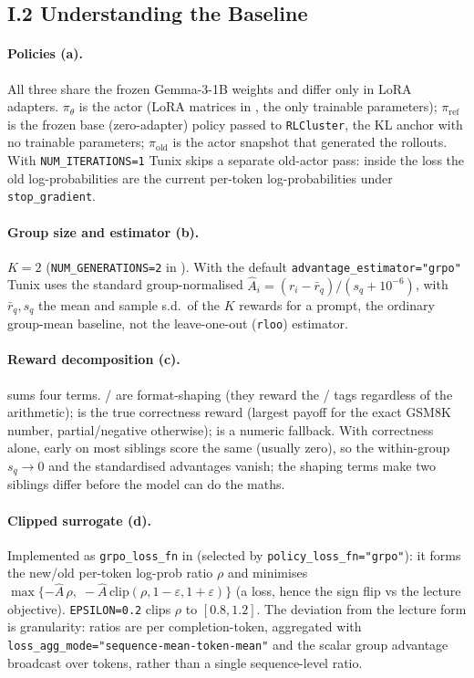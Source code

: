 \subsection{I.2 Understanding the Baseline}

\paragraph{Policies (a).}
All three share the frozen Gemma-3-1B weights and differ only in LoRA adapters. $\pi_\theta$ is the
actor (LoRA matrices in , the only trainable parameters);
$\pi_{\mathrm{ref}}$ is the frozen base (zero-adapter) policy passed to \texttt{RLCluster}, the KL
anchor with no trainable parameters; $\pi_{\mathrm{old}}$ is the actor snapshot that generated the
rollouts. With \texttt{NUM\_ITERATIONS=1} Tunix skips a separate old-actor pass: inside the loss
the old log-probabilities are the current per-token log-probabilities under \texttt{stop\_gradient}.

\paragraph{Group size and estimator (b).}
$K=2$ (\texttt{NUM\_GENERATIONS=2} in ). With the default
\texttt{advantage\_estimator="grpo"} Tunix uses the standard group-normalised
$\hat A_i = (r_i-\bar r_q)/(s_q+10^{-6})$, with $\bar r_q,s_q$ the mean and sample s.d.\ of the $K$
rewards for a prompt, the ordinary group-mean baseline, not the leave-one-out (\texttt{rloo})
estimator.

\paragraph{Reward decomposition (c).}
 sums four terms.
/ are format-shaping (they reward the
/ tags regardless of the arithmetic);  is the
true correctness reward (largest payoff for the exact GSM8K number, partial/negative otherwise);
 is a numeric fallback. With correctness alone, early on most siblings score the
same (usually zero), so the within-group $s_q\to0$ and the standardised advantages vanish; the
shaping terms make two siblings differ before the model can do the maths.

\paragraph{Clipped surrogate (d).}
Implemented as \texttt{grpo\_loss\_fn} in  (selected by
\texttt{policy\_loss\_fn="grpo"}): it forms the new/old per-token log-prob ratio $\rho$ and minimises
$\max\{-\hat A\,\rho,\;-\hat A\,\mathrm{clip}(\rho,1-\varepsilon,1+\varepsilon)\}$ (a loss, hence the
sign flip vs the lecture objective). \texttt{EPSILON=0.2} clips $\rho$ to $[0.8,1.2]$. The deviation
from the lecture form is granularity: ratios are per completion-token, aggregated with
\texttt{loss\_agg\_mode="sequence-mean-token-mean"} and the scalar group advantage broadcast over
tokens, rather than a single sequence-level ratio.
